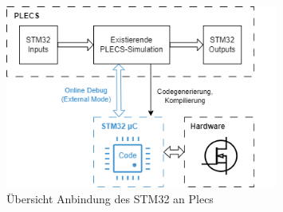 \documentclass[a4paper,11pt,oneside]{article}
\begin{document}
\begin{figure}[H]
	\centering
	\includegraphics[width=0.8\textwidth]{draft_poster_STM32.drawio.png}
	\caption{Übersicht Anbindung des STM32 an Plecs}
\end{figure}

	\newpage
	\printbibliography
\end{document}
